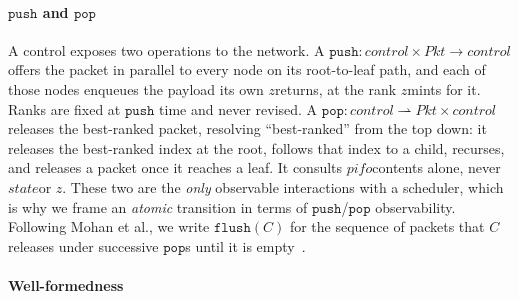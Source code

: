 \documentclass[sigplan,anonymous,review,nonacm]{acmart}
\newcommand{\push}{\ensuremath{\mathtt{push}}}
\newcommand{\pop}{\ensuremath{\mathtt{pop}}}
\newcommand{\flush}{\ensuremath{\mathtt{flush}}}
\newcommand{\notation}[1]{\ensuremath{#1}\ifmmode\else\xspace\fi}
\newcommand{\pifo}{\notation{\mathit{pifo}}}
\newcommand{\zz}{\notation{\mathit{z}}}
\newcommand{\stt}{\notation{\mathit{state}}}
\begin{document}

\paragraph{\push{} and \pop{}}

A control exposes two operations to the network.
A \(\push : \mathit{control} \times \mathit{Pkt} \to \mathit{control}\) offers the packet in parallel to every node on its root-to-leaf path, and each of those nodes enqueues the payload its own \zz returns, at the rank \zz mints for it.
Ranks are fixed at \push{} time and never revised.
A \(\pop : \mathit{control} \rightharpoonup \mathit{Pkt} \times \mathit{control}\) releases the best-ranked packet, resolving ``best-ranked'' from the top down: it releases the best-ranked index at the root, follows that index to a child, recurses, and releases a packet once it reaches a leaf.
It consults \pifo contents alone, never \stt or \zz.
These two are the \emph{only} observable interactions with a scheduler, which is why we frame an \emph{atomic} transition in terms of \push{}/\pop{} observability.
Following Mohan et al., we write \(\flush(C)\) for the sequence of packets that \(C\) releases under successive \pop{}s until it is empty~\cite{Mohan23}.

\paragraph{Well-formedness}
\end{document}
